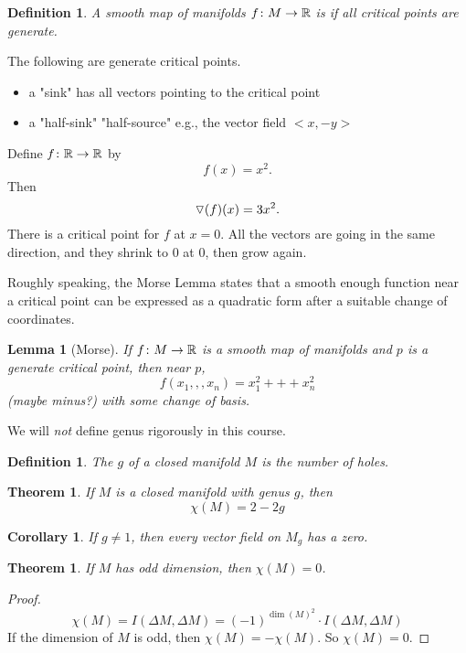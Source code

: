 \documentclass[11pt]{amsbook}
\theoremstyle{mystyle} %
\newtheorem{thrm}[thm]{Theorem}
\newtheorem{defi}[thm]{Definition}
\newtheorem{coro}[thm]{Corollary}
\newtheorem{lemm}[thm]{Lemma}
\numberwithin{thm}{section}
\begin{document}
\begin{defi}
	A smooth map of manifolds $f\colon M \to {\mathbb R}$ is  if all critical points are generate.
\end{defi}

\begin{example}
	The following are generate critical points.
	\begin{itemize}
		\item a "sink" has all vectors pointing to the critical point
		\item a "half-sink" "half-source" e.g., the vector field $< x, -y >$
	\end{itemize}
\end{example}

\begin{example}
	Define $f\colon {\mathbb R} \to {\mathbb R}$ by
	$$f(x) = x^2.$$ Then
	$$\triangledown(f)(x) = 3x^2.$$
	There is a critical point for $f$ at $x = 0$.
	All the vectors are going in the same direction, and they shrink to 0 at 0, then grow again.
\end{example}

Roughly speaking, the Morse Lemma states that a smooth enough function near a critical point can be expressed as a quadratic form after a suitable change of coordinates.

\begin{lemm}[Morse]
	If $f\colon M \to {\mathbb R}$ is a smooth map of manifolds and $p$ is a generate critical point, then near $p$, $$f(x_1,,,x_n) = x_1^2 +++ x_n^2$$ (maybe minus?) with some change of basis.
\end{lemm}

We will \emph{not} define genus rigorously in this course.

\begin{defi}
	The  $g$ of a closed manifold $M$ is the number of holes.
\end{defi}
\begin{thrm}
	If $M$ is a closed manifold with genus $g$, then $$\chi(M) = 2 - 2g$$
\end{thrm}
\begin{coro}
	If $g \neq 1$, then every vector field on $M_g$ has a zero.
\end{coro}

\begin{thrm}
	If $M$ has odd dimension, then $\chi(M) = 0$.
\end{thrm}
\begin{proof}
	$$\chi(M) = I(\Delta M, \Delta M) = (-1)^{\dim(M)^2} \cdot I(\Delta M, \Delta M)$$
	If the dimension of $M$ is odd, then $\chi(M) = -\chi(M)$.
	So $\chi(M) = 0$.
\end{proof}
\end{document}
